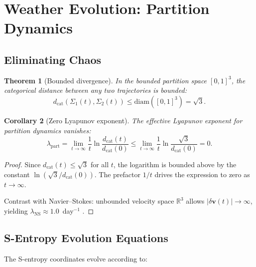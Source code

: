 \documentclass[10pt,twocolumn]{article}
\newtheorem{theorem}{Theorem}[section]
\newtheorem{corollary}[theorem]{Corollary}
\theoremstyle{definition}
\theoremstyle{remark}
\newcommand{\R}{\mathbb{R}}
\newcommand{\dcat}{d_{\mathrm{cat}}}
\begin{document}
\section{Weather Evolution: Partition Dynamics}
\label{sec:weather}

\subsection{Eliminating Chaos}\label{sec:chaos}

\begin{theorem}[Bounded divergence]\label{thm:bounded}
In the bounded partition space $[0,1]^3$, the categorical
distance between any two trajectories is bounded:
\begin{equation}\label{eq:bounded}
  \dcat(\Sigma_1(t),\Sigma_2(t))
  \le\mathrm{diam}([0,1]^3)=\sqrt{3}.
\end{equation}
\end{theorem}

\begin{corollary}[Zero Lyapunov exponent]
\label{cor:lyapunov}
The effective Lyapunov exponent for partition dynamics
vanishes:
\begin{equation}\label{eq:lyapunov}
  \boxed{\lambda_{\mathrm{part}}
  = \lim_{t\to\infty}\frac{1}{t}
    \ln\frac{\dcat(t)}{\dcat(0)}
  \le\lim_{t\to\infty}\frac{1}{t}
    \ln\frac{\sqrt{3}}{\dcat(0)}=0.}
\end{equation}
\end{corollary}

\begin{proof}
Since $\dcat(t)\le\sqrt{3}$ for all $t$, the logarithm is
bounded above by the constant $\ln(\sqrt{3}/\dcat(0))$.
The prefactor $1/t$ drives the expression to zero as
$t\to\infty$.

Contrast with Navier--Stokes: unbounded velocity space
$\R^3$ allows $|\delta\mathbf{v}(t)|\to\infty$, yielding
$\lambda_{\mathrm{NS}}\approx 1.0$~day$^{-1}$
\citep{Lorenz1963}.
\end{proof}

\subsection{S-Entropy Evolution Equations}\label{sec:evolution}

The S-entropy coordinates evolve according to:
\end{document}
